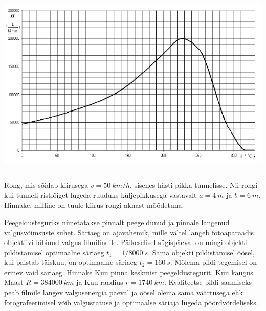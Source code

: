 \documentclass[10pt]{article}
\begin{document}
{\begin{center}
	\includegraphics[width=\linewidth]{2008-lahg-10-yl}
\end{center}
\probend
\bigskip
\newpage\subsection{\protect{}}


Rong, mis sõidab kiirusega $v = \SI{50}{km/h}$, sisenes hästi pikka tunnelisse. Nii rongi kui tunneli ristlõiget lugeda ruuduks küljepikkusega vastavalt $a = \SI{4}{m}$ ja $b = \SI{6}{m}$. Hinnake, milline on tuule kiirus rongi aknast mõõdetuna.
\probend
\bigskip


Peegeldusteguriks nimetatakse pinnalt peegeldunud ja pinnale langenud valgusvõimsuste suhet. Säriaeg on ajavahemik, mille vältel langeb fotoaparaadis objektiivi läbinud valgus filmilindile. Päikeselisel sügispäeval on mingi objekti pildistamisel optimaalne säriaeg $t_1 = 1/\SI{8000}{s}$. Sama objekti pildistamisel öösel, kui paistab täiskuu, on optimaalne säriaeg $t_2 = \SI{160}{s}$. Mõlema pildi tegemisel on erinev vaid säriaeg. Hinnake Kuu pinna keskmist peegeldustegurit. Kuu kaugus Maast $R = \SI{384000}{km}$ ja Kuu raadius $r = \SI{1740}{km}$. Kvaliteetse pildi saamiseks peab filmile langev valgusenergia päeval ja öösel olema sama väärtusega ehk fotografeerimisel võib valgustatuse ja optimaalse säriaja lugeda pöördvõrdeliseks.
\probend
\bigskip

}
\end{document}

